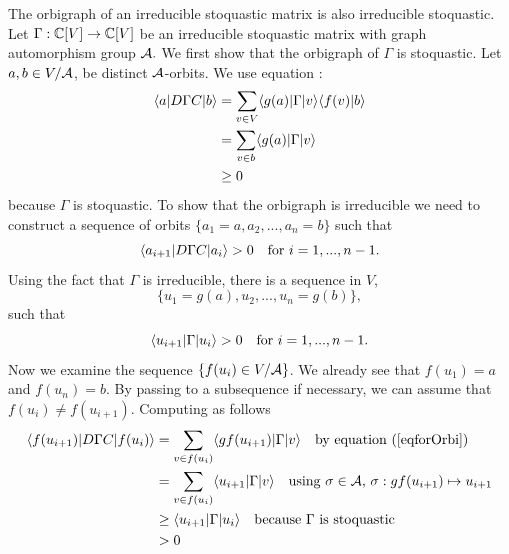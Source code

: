 The orbigraph of an irreducible stoquastic matrix is also
irreducible stoquastic.
\doproof
Let $\Gamma:\mathbb{C}[V]\to\mathbb{C}[V]$ be an irreducible stoquastic matrix
with graph automorphism group $\mathcal{A}.$
We first show that the orbigraph of $\Gamma$ is stoquastic.
Let $a, b\in V/\mathcal{A}$, be distinct $\mathcal{A}$-orbits. We use equation :
\begin{align*}
   \langle{a}| D\Gamma C |{b}\rangle
        &= \sum_{v\in V} \langle{g(a)}|\Gamma |{v}\rangle\langle{f(v)}|{b}\rangle \\
        &= \sum_{v\in b} \langle{g(a)}|\Gamma |{v}\rangle \\
        &\ge 0
\end{align*}
because $\Gamma$ is stoquastic.
To show that the orbigraph is irreducible we need to construct a sequence of orbits
$\{ a_1=a,a_2,...,a_n=b \}$ such that 
$$
    \langle{a_{i+1}}|D\Gamma C|{a_{i}}\rangle>0\ \ \mbox{ for $i=1,...,n-1.$}
$$
Using the fact that $\Gamma$ is irreducible, there is a sequence
in $V$,
$$
    \{ u_1=g(a), u_2, ..., u_n=g(b) \},
$$ such that 
$$
    \langle{u_{i+1}}|\Gamma |{u_{i}}\rangle>0\ \ \mbox{ for $i=1,...,n-1.$}
$$
Now we examine the sequence $\{f(u_i)\in V/\mathcal{A}\}$.
We already see that $f(u_1)=a$ and $f(u_n)=b$. By passing to
a subsequence if necessary, we can assume that $f(u_i)\ne f(u_{i+1}).$
Computing as follows 
\begin{align*}
    \bra{f(u_{i+1})} D\Gamma C \ket{f(u_i)} 
        &= \sum_{v\in f(u_i)} \bra{gf(u_{i+1})} \Gamma \ket{v} \ \ \ 
        \mbox{by equation \Eref{eqforOrbi}}\\
        &= \sum_{v\in f(u_i)} \bra{u_{i+1}} \Gamma \ket{v}\ \ \ 
        \mbox{using $\sigma\in\auto$, $\sigma:gf(u_{i+1})\mapsto u_{i+1}$} \\
        &\ge \bra{u_{i+1}} \Gamma \ket{u_i}\ \ \ 
        \mbox{because $\Gamma$ is stoquastic}\\
        &> 0
\end{align*}
